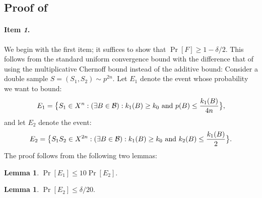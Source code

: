 \documentclass{article}
\newtheorem{lemma}[theorem]{Lemma}
\newcommand{\B}{{\cal B}}
\newcommand{\samp}{S}
\begin{document}
\subsection{Proof of }

\paragraph{Item {\it 1}.}
We begin with the first item;
it suffices to show that $\Pr[F]\geq 1-\delta/2$.
This follows from the standard uniform convergence bound with
the difference that of using the multiplicative Chernoff bound instead
of the additive bound:
Consider a double sample $S=(\samp_1,\samp_2)\sim p^{2n}$.
Let $E_1$ denote the event whose probability we want to bound:
\[
E_1 =\bigl\{ S_1\in X^n : (\exists {B\in\B}):
  k_{1}(B) \geq k_0 \mbox{ and } p(B) \leq \frac{k_{1}(B)}{4n}\bigr\}, 
\]
and let $E_2$ denote the event:
\[
E_2 = 
\bigl\{ S_1S_2\in X^{2n} : (\exists {B\in\B}):
  k_{1}(B) \geq k_0 \mbox{ and } k_{2}(B) \leq \frac{k_{1}(B)}{2}\bigr\}.
\]
The proof follows from the following two lemmas:
\begin{lemma}\label{lem:aux11}
$\Pr[E_1]\leq 10\Pr[E_2].$
\end{lemma}
\begin{lemma}\label{lem:aux12}
$\Pr[E_2]\leq \delta/20.$
\end{lemma}
\end{document}
